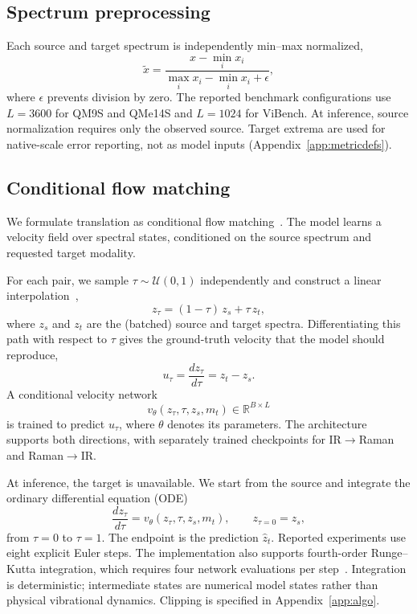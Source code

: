 \documentclass[pdflatex,sn-mathphys-num]{sn-jnl}%
\theoremstyle{thmstyleone}%
\theoremstyle{thmstyletwo}%
\theoremstyle{thmstylethree}%
\begin{document}
\subsection*{Spectrum preprocessing}

Each source and target spectrum is independently min--max normalized,
\[
\tilde{x}=\frac{x-\min_i x_i}{\max_i x_i-\min_i x_i+\epsilon},
\]
where $\epsilon$ prevents division by zero. The reported benchmark configurations use $L=3600$ for QM9S and QMe14S and $L=1024$ for ViBench. At inference, source normalization requires only the observed source. Target extrema are used for native-scale error reporting, not as model inputs (Appendix~\ref{app:metricdefs}).

\subsection*{Conditional flow matching}

We formulate translation as conditional flow matching~\cite{lipman2023flow,albergo2023building,tong2023conditional}. The model learns a velocity field over spectral states, conditioned on the source spectrum and requested target modality.

For each pair, we sample $\tau\sim\mathcal{U}(0,1)$ independently and construct a linear interpolation~\cite{liu2022rectified,tong2023conditional},
\[
z_\tau=(1-\tau)\,z_s+\tau\,z_t ,
\]
where $z_s$ and $z_t$ are the (batched) source and target spectra. Differentiating this path with respect to $\tau$ gives the ground-truth velocity that the model should reproduce,
\[
u_\tau = \frac{d z_\tau}{d\tau}=z_t-z_s .
\]
A conditional velocity network
\[
v_\theta(z_\tau,\tau,z_s,m_t)\in\mathbb{R}^{B\times L}
\]
is trained to predict $u_\tau$, where $\theta$ denotes its parameters. The architecture supports both directions, with separately trained checkpoints for IR$\rightarrow$Raman and Raman$\rightarrow$IR.

At inference, the target is unavailable. We start from the source and integrate the ordinary differential equation (ODE)~\cite{chen2018neural}
\[
\frac{d z_\tau}{d\tau}
=
v_\theta(z_\tau,\tau,z_s,m_t),
\qquad z_{\tau=0}=z_s ,
\]
from $\tau=0$ to $\tau=1$. The endpoint is the prediction $\hat z_t$. Reported experiments use eight explicit Euler steps. The implementation also supports fourth-order Runge--Kutta integration, which requires four network evaluations per step~\cite{butcher2016numerical}. Integration is deterministic; intermediate states are numerical model states rather than physical vibrational dynamics. Clipping is specified in Appendix~\ref{app:algo}.
\end{document}
